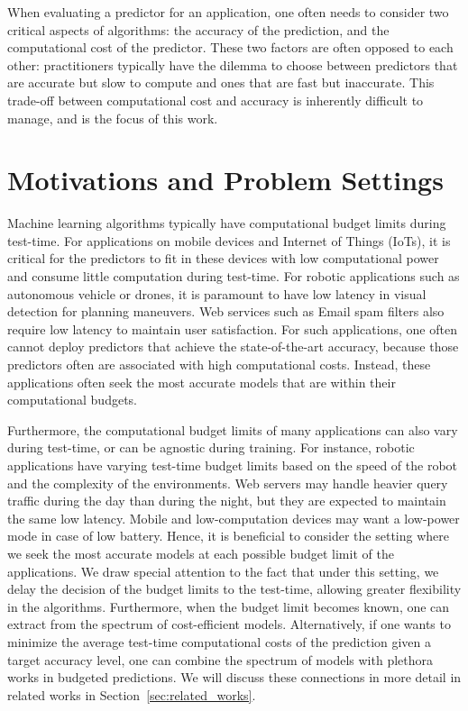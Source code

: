 

When evaluating a predictor for an application, one often needs to consider two critical aspects of algorithms: the accuracy of the prediction, and the computational cost of the predictor. These two factors are often opposed to each other: practitioners typically have the dilemma to choose between predictors that are accurate but slow to compute and ones that are fast but inaccurate. 
This trade-off between computational cost and accuracy is inherently difficult to manage, and is the focus of this work.


\section{Motivations and Problem Settings}

Machine learning algorithms typically have computational budget limits during test-time. For applications on mobile devices and Internet of Things (IoTs), it is critical for the predictors to fit in these devices with low computational power and consume little computation during test-time. For robotic applications such as autonomous vehicle or drones, it is paramount to have low latency in visual detection for planning maneuvers. Web services such as Email spam filters also require low latency to maintain user satisfaction. 
For such applications, one often cannot deploy predictors that achieve the state-of-the-art accuracy, because those predictors often are associated with high computational costs. Instead, these applications often seek the most accurate models that are within their computational budgets. 

Furthermore, the computational budget limits of many applications can also vary during test-time, or can be agnostic during training. 
For instance, robotic applications have varying test-time budget limits based on the speed of the robot and the complexity of the environments. 
Web servers may handle heavier query traffic during the day than during the night, but they are expected to maintain the same low latency. 
Mobile and low-computation devices may want a low-power mode in case of low battery. 
Hence, it is beneficial to consider the setting where we seek the most accurate models at each possible budget limit of the applications. 
We draw special attention to the fact that under this setting, we delay the decision of the budget limits to the test-time, allowing greater flexibility in the algorithms. Furthermore, when the budget limit becomes known, one can extract from the spectrum of cost-efficient models. Alternatively, if one wants to minimize the average test-time computational costs of the prediction given a target accuracy level, one can combine the spectrum of models with plethora works in budgeted predictions. We will discuss these connections in more detail in related works in Section~\ref{sec:related_works}.

